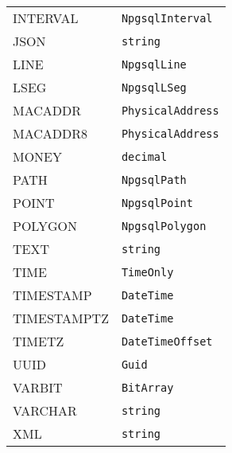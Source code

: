 \documentclass[sigconf,techreport,authorversion,nonacm]{acmart}
\begin{document}
\begin{table}[p]
\begin{tabular}{l | l}
                INTERVAL                               & \texttt{NpgsqlInterval}                 \\
                JSON                                   & \texttt{string}                         \\
                LINE                                   & \texttt{NpgsqlLine}                     \\
                LSEG                                   & \texttt{NpgsqlLSeg}                     \\
                MACADDR                                & \texttt{PhysicalAddress}                \\
                MACADDR8                               & \texttt{PhysicalAddress}                \\
                MONEY                                  & \texttt{decimal}                        \\
                PATH                                   & \texttt{NpgsqlPath}                     \\
                POINT                                  & \texttt{NpgsqlPoint}                    \\
                POLYGON                                & \texttt{NpgsqlPolygon}                  \\
                TEXT                                   & \texttt{string}                         \\
                TIME                                   & \texttt{TimeOnly}                       \\
                TIMESTAMP                              & \texttt{DateTime}                       \\
                TIMESTAMPTZ                            & \texttt{DateTime}                       \\
                TIMETZ                                 & \texttt{DateTimeOffset}                 \\
                UUID                                   & \texttt{Guid}                           \\
                VARBIT                                 & \texttt{BitArray}                       \\
                VARCHAR                                & \texttt{string}                         \\
                XML                                    & \texttt{string}                         \\ \midrule

\end{tabular}
\end{table}
\end{document}
